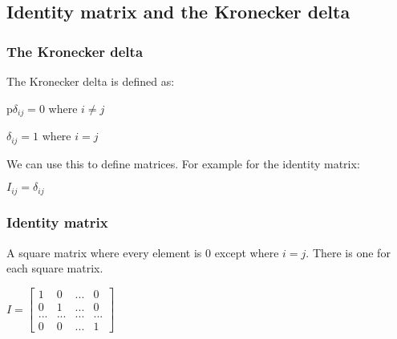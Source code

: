 
\subsection{Identity matrix and the Kronecker delta}
\subsubsection{The Kronecker delta}

The Kronecker delta is defined as:

p\(\delta_{ij}=0\) where \(i\ne j\)

\(\delta_{ij}=1\) where \(i=j\)

We can use this to define matrices. For example for the identity matrix:

\(I_{ij}=\delta_{ij}\)

\subsubsection{Identity matrix}

A square matrix where every element is \(0\) except where \(i=j\). There is one for each square matrix.

\(I=\begin{bmatrix}1& 0&...&0\\0 & 1&...&0\\...&...&...&...\\0&0&...&1\end{bmatrix}\)

